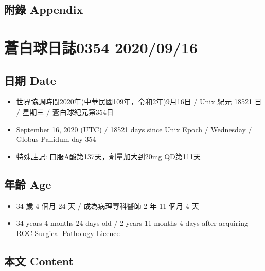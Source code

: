 \documentclass[a5paper, 11pt
]{book}
\providecommand{\tightlist}{%
  \setlength{\itemsep}{0pt}\setlength{\parskip}{0pt}}
\begin{document}
\hypertarget{ux9644ux9304-appendix-14}{%
\subsection{附錄 Appendix}\label{ux9644ux9304-appendix-14}}

\hypertarget{ux84bcux767dux7403ux65e5ux8a8c0354-20200916}{%
\section{蒼白球日誌0354
2020/09/16}\label{ux84bcux767dux7403ux65e5ux8a8c0354-20200916}}

\hypertarget{ux65e5ux671f-date-15}{%
\subsection{日期 Date}\label{ux65e5ux671f-date-15}}

\begin{itemize}
\tightlist
\item
  世界協調時間2020年(中華民國109年，令和2年)9月16日 / Unix 紀元 18521 日
  / 星期三 / 蒼白球紀元第354日
\item
  September 16, 2020 (UTC) / 18521 days since Unix Epoch / Wednesday /
  Globus Pallidum day 354
\item
  特殊註記: 口服A酸第137天，劑量加大到20mg QD第111天
\end{itemize}

\hypertarget{ux5e74ux9f61-age-15}{%
\subsection{年齡 Age}\label{ux5e74ux9f61-age-15}}

\begin{itemize}
\tightlist
\item
  34 歲 4 個月 24 天 / 成為病理專科醫師 2 年 11 個月 4 天
\item
  34 years 4 months 24 days old / 2 years 11 months 4 days after
  acquiring ROC Surgical Pathology Licence
\end{itemize}

\hypertarget{ux672cux6587-content-15}{%
\subsection{本文 Content}\label{ux672cux6587-content-15}}
\end{document}
